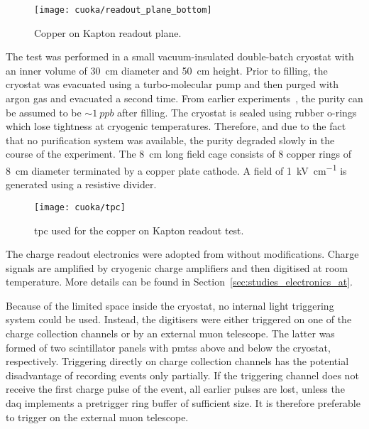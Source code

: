 \begin{figure}[htb]
	\centering
	\texttt{[image: cuoka/readout\_plane\_bottom]}
	\caption{Copper on Kapton readout plane.}
	\label{fig:cuoka_readout-plane}
\end{figure}

The test was performed in a small vacuum-insulated double-batch cryostat with an inner volume of \SI{30}{\centi\metre} diameter and \SI{50}{\centi\metre} height.
Prior to filling, the cryostat was evacuated using a turbo-molecular pump and then purged with argon gas and evacuated a second time.
From earlier experiments~\cite{2photonAbs}, the purity can be assumed to be $\sim{\SI{1}{ppb}}$ after filling.
The cryostat is sealed using rubber o-rings which lose tightness at cryogenic temperatures.
Therefore, and due to the fact that no purification system was available, the purity degraded slowly in the course of the experiment.
The \SI{8}{\centi\metre} long field cage consists of \num{8} copper rings of \SI{8}{\centi\metre} diameter terminated by a copper plate cathode.
A field of \SI{1}{\kilo\volt\per\centi\metre} is generated using a resistive divider.

\begin{figure}[htb]
	\centering
	\texttt{[image: cuoka/tpc]}
	\caption{\gls{tpc} used for the copper on Kapton readout test.}
	\label{fig:cuoka_tpc}
\end{figure}

The charge readout electronics were adopted from \AT{} without modifications.
Charge signals are amplified by cryogenic charge amplifiers and then digitised at room temperature.
More details can be found in Section~\ref{sec:studies_electronics_at}.

Because of the limited space inside the cryostat, no internal light triggering system could be used.
Instead, the digitisers were either triggered on one of the charge collection channels or by an external muon telescope.
The latter was formed of two scintillator panels with \glspl{pmt}s above and below the cryostat, respectively.
Triggering directly on charge collection channels has the potential disadvantage of recording events only partially.
If the triggering channel does not receive the first charge pulse of the event, all earlier pulses are lost, unless the \gls{daq} implements a pretrigger ring buffer of sufficient size.
It is therefore preferable to trigger on the external muon telescope.

